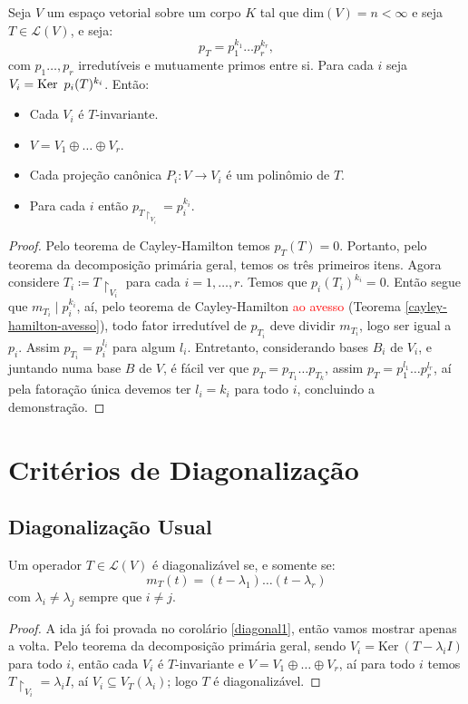 \documentclass[11pt,twoside,a4paper]{book}
\begin{document}
\begin{teorema}\label{primaria caracteristico}
Seja \(V\) um espaço vetorial sobre um corpo \(K\) tal que
\(\text{dim}(V)=n<\infty\) e seja \(T\in\mathcal{L}(V)\), e seja:
\[
p_T=p_1^{k_1}\ldots p_r^{k_r},
\]
com \(p_1\dots,p_r\) irredutíveis e mutuamente
primos entre si. Para cada $i$ seja $V_i=\operatorname{Ker} \ p_i(T)^{k_i}$. Então:
\begin{itemize}
\item Cada $V_i$ é $T$-invariante.
\item $V=V_1\oplus\dots\oplus V_r$.
\item Cada projeção canônica $P_i:V\rightarrow V_i$ é um polinômio de $T$.
\item Para cada $i$ então \(p_{T\upharpoonright_{V_i}}=p_i^{k_i}\).
\end{itemize}
\end{teorema}
\begin{proof}
Pelo teorema de Cayley-Hamilton temos \(p_T(T)=0\). Portanto, pelo teorema da decomposição primária geral, temos os três primeiros itens. Agora considere \(T_i\coloneqq T\upharpoonright_{V_i}\)
para cada \(i=1,\dots,r\).
Temos que \(p_i(T_i)^{k_i}=0\). Então segue que \(m_{T_i}\mid
p_i^{k_i}\), aí, pelo teorema de Cayley-Hamilton \textcolor{red}{ao avesso} (Teorema \ref{cayley-hamilton-avesso}), todo fator irredutível de $p_{T_i}$ deve dividir $m_{T_i}$, logo ser igual a $p_i$. Assim $p_{T_i}=p_i^{l_i}$ para algum $l_i$. Entretanto, considerando bases $B_i$ de $V_i$, e juntando numa base $B$ de $V$, é fácil ver que $p_T=p_{T_1}\dots p_{T_k}$, assim $p_T=p_1^{l_1}\ldots p_r^{l_r}$, aí pela fatoração única devemos ter $l_i=k_i$ para todo $i$, concluindo a demonstração.
\end{proof}

\section{Critérios de Diagonalização}

\subsection{Diagonalização Usual}

\begin{teorema}\label{diagonal2}
Um operador \(T\in\mathcal{L}(V)\) é diagonalizável se, e somente se:
\[
m_T(t)=(t-\lambda_1)\ldots(t-\lambda_r)
\]
com \(\lambda_i\not=\lambda_j\) sempre que \(i\not= j\).
\end{teorema}
\begin{proof}
A ida já foi provada no corolário \ref{diagonal1}, então
vamos mostrar apenas a volta. Pelo teorema da decomposição primária geral, sendo $V_i=\mathrm{Ker} \ (T-\lambda_iI)$ para todo $i$, então cada $V_i$ é $T$-invariante e \(V=V_1\oplus\ldots\oplus V_r\), aí para todo $i$ temos \(T\upharpoonright_{V_i}=\lambda_iI\), aí \(V_i\subseteq V_T(\lambda_i)\); logo $T$ é diagonalizável. 
\end{proof}
\end{document}
